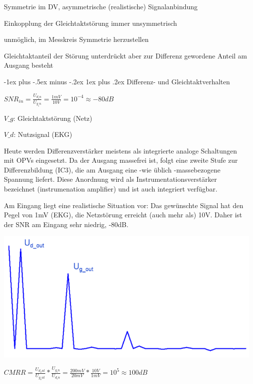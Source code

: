\documentclass[a4paper]{article}
\makeatletter
\renewcommand{\subsubsection}{\@startsection{subsubsection}{3}{0mm}%
 {-1ex plus -.5ex minus -.2ex}%
 {1ex plus .2ex}%
 {\normalfont\small\bfseries}}
\makeatother
\begin{document}
\begin{multicols}{3}
  Symmetrie im DV, asymmetrische (realistische) Signalanbindung
  \begin{itemize*}
    \item Einkopplung der Gleichtaktstörung immer unsymmetrisch
    \item unmöglich, im Messkreis Symmetrie herzustellen
    \item Gleichtaktanteil der Störung unterdrückt aber zur Differenz gewordene Anteil am Ausgang besteht
    \end{itemize*}

  \subsubsection{Differenz- und Gleichtaktverhalten}\label{differenz--und-gleichtaktverhalten}
  \begin{itemize*}
    \item $SNR_{in} = \frac{U_{d_in}}{U_{g_in}}=\frac{1mV}{10V}=10^{-4}\approx -80dB$
    \item $V\_g$: Gleichtaktstörung (Netz)
    \item $V\_d$: Nutzsignal (EKG)
    \item Heute werden Differenzverstärker meistens als integrierte analoge Schaltungen mit OPVs eingesetzt. Da der Ausgang massefrei ist, folgt eine zweite Stufe zur Differenzbildung (IC3), die am Ausgang eine -wie üblich -massebezogene Spannung liefert. Diese Anordnung wird als Instrumentationsverstärker bezeichnet (instrumenation amplifier) und ist auch integriert verfügbar.
    \item Am Eingang liegt eine realistische Situation vor: Das gewünschte Signal hat den Pegel von 1mV (EKG), die Netzstörung erreicht (auch mehr als) 10V. Daher ist der SNR am Eingang sehr niedrig, -80dB.
    \item \includegraphics[width=.5\linewidth]{Assets/Biosignalverarbeitung-Diff-und-Gleichtakt2.png}
    \item $CMRR=\frac{U_{d_out}}{U_{g_out}}*\frac{U_{g_in}}{U_{d_in}}=\frac{200mV}{20mV} *\frac{10V}{1mV}=10^5 \approx 100dB$

\end{itemize*}
\end{multicols}
\end{document}
